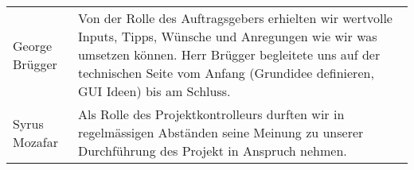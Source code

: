 \begin{tabular}{p{3cm} p{10cm}}
George Brügger & Von der Rolle des Auftragsgebers erhielten wir wertvolle Inputs, Tipps, Wünsche und Anregungen wie wir was umsetzen können. Herr Brügger begleitete uns auf der technischen Seite vom Anfang (Grundidee definieren, GUI Ideen) bis am Schluss.\\
Syrus Mozafar & Als Rolle des Projektkontrolleurs durften wir in regelmässigen Abständen seine Meinung zu unserer Durchführung des Projekt in Anspruch nehmen.\\
\end{tabular}
